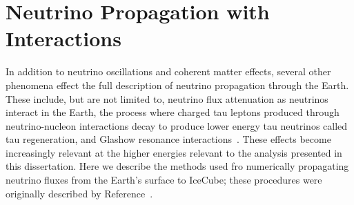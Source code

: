 \documentclass[main.tex]{subfiles}
\begin{document}
\section{Neutrino Propagation with Interactions}
In addition to neutrino oscillations and coherent matter effects, several other phenomena effect the full description of neutrino propagation through the Earth. 
These include, but are not limited to, neutrino flux attenuation as neutrinos interact in the Earth, the process where charged tau leptons produced through neutrino-nucleon interactions decay to produce lower energy tau neutrinos called tau regeneration, and Glashow resonance interactions~\cite{PhysRev.118.316}.
These effects become increasingly relevant at the higher energies relevant to the analysis presented in this dissertation.  
Here we describe the methods used fro numerically propagating neutrino fluxes from the Earth's surface to IceCube; these procedures were originally described by Reference~\cite{arguelles2021nusquids}.
\end{document}
